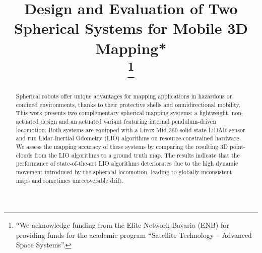 \documentclass[a4paper, conference]{IEEEtran}
\begin{document}
\title{Design and Evaluation of Two Spherical Systems for Mobile 3D Mapping*\\

\thanks{*We acknowledge funding from the Elite Network Bavaria (ENB) 
for providing funds for the academic program ``Satellite Technology -- Advanced Space Systems''.}
}

\author{
}

\maketitle

\begin{abstract}
Spherical robots offer unique advantages for mapping applications in hazardous or confined environments, thanks to their protective shells and omnidirectional mobility. 
This work presents two complementary spherical mapping systems: a lightweight, non-actuated design and an actuated variant featuring internal pendulum-driven locomotion. 
Both systems are equipped with a Livox Mid-360 solid-state LiDAR sensor and run Lidar-Inertial Odometry (LIO) algorithms on resource-constrained hardware. 
We assess the mapping accuracy of these systems by comparing the resulting 3D point-clouds from the LIO algorithms to a ground truth map.
The results indicate that the performance of state-of-the-art LIO algorithms deteriorates due to the high dynamic movement introduced by the spherical locomotion, leading to globally inconsistent maps and sometimes unrecoverable drift.
\end{abstract}
\end{document}
